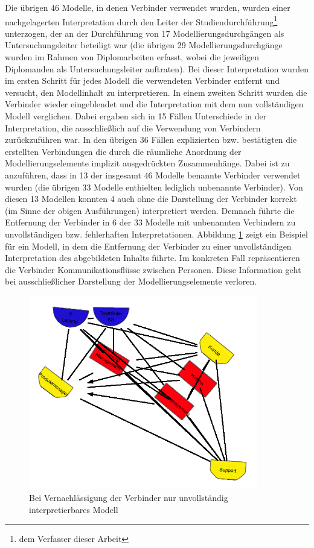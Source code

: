 Die übrigen 46 Modelle, in denen Verbinder verwendet wurden, wurden einer nachgelagerten Interpretation durch den Leiter der Studiendurchführung\footnote{dem Verfasser dieser Arbeit} unterzogen, der an der Durchführung von 17 Modellierungsdurchgängen als Untersuchungsleiter beteiligt war (die übrigen 29 Modellierungsdurchgänge wurden im Rahmen von Diplomarbeiten erfasst, wobei die jeweiligen Diplomanden als Untersuchungsleiter auftraten). Bei dieser Interpretation wurden im ersten Schritt für jedes Modell die verwendeten Verbinder entfernt und versucht, den Modellinhalt zu interpretieren. In einem zweiten Schritt wurden die Verbinder wieder eingeblendet und die Interpretation mit dem nun vollständigen Modell verglichen. Dabei ergaben sich in 15 Fällen Unterschiede in der Interpretation, die ausschließlich auf die Verwendung von Verbindern zurückzuführen war. In den übrigen 36 Fällen explizierten bzw. bestätigten die erstellten Verbindungen die durch die räumliche Anordnung der Modellierungselemente implizit ausgedrückten Zusammenhänge. Dabei ist zu anzuführen, dass in 13 der insgesamt 46 Modelle benannte Verbinder verwendet wurden (die übrigen 33 Modelle enthielten lediglich unbenannte Verbinder). Von diesen 13 Modellen konnten 4 auch ohne die Darstellung der Verbinder korrekt (im Sinne der obigen Ausführungen) interpretiert werden. Demnach führte die Entfernung der Verbinder in 6 der 33 Modelle mit unbenannten Verbindern zu unvollständigen bzw. fehlerhaften Interpretationen. Abbildung \ref{fig:img_Evaluierung_modell_verbinder_wichtig} zeigt ein Beispiel für ein Modell, in dem die Entfernung der Verbinder zu einer unvollständigen Interpretation des abgebildeten Inhalts führte. Im konkreten Fall repräsentieren die Verbinder Kommunikationsflüsse zwischen Personen. Diese Information geht bei ausschließlicher Darstellung der Modellierungselemente verloren.

\begin{figure}[htbp]
	\centering
		\includegraphics[width=10cm]{img/Evaluierung/modell_verbinder_wichtig.png}
	\caption{Bei Vernachlässigung der Verbinder nur unvollständig interpretierbares Modell}
	\label{fig:img_Evaluierung_modell_verbinder_wichtig}
\end{figure}

